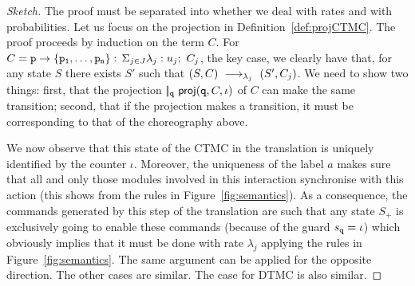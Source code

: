 \begin{proof}[Sketch] The proof must be separated into whether we deal
  with rates and with probabilities. Let us focus on the projection in
  Definition~\ref{def:projCTMC}. The proof proceeds by induction on
  the term $C$. For $C=\mathtt{p}\rightarrow \{\mathtt{\mathtt{p}_1,\ldots,\mathtt{p}_n}\}:\,\Sigma_{j\in J}\lambda_j: u_j;\ C_j$, the
  key case, we clearly have that, for any state $S$ there exists $S'$
  such that $(S,C)\ \longrightarrow_{\lambda_j}\ (S',C_j)$. We need to show two
  things: first, that the projection
  $|\!|_{\mathtt{q}}\ \mathsf{proj}{(\mathtt{q},C,\iota)}$ of $C$ can make the same
  transition; second, that if the projection makes a transition, it
  must be corresponding to that of the choreography above.

  We now observe that this state of the CTMC in the translation is
  uniquely identified by the counter $\iota$. 
  Moreover, the uniqueness of the label $a$ makes sure that all and
  only those modules involved in this interaction synchronise with
  this action (this shows from the rules in
  Figure~\ref{fig:semantics}).  As a consequence, the commands
  generated by this step of the translation are such that any state
  $S_+$ is exclusively going to enable these commands (because of the
  guard $s_{\mathtt{q}}=\iota$) which obviously implies that it must be
  done with rate $\lambda_j$ applying the rules in
  Figure~\ref{fig:semantics}. The same argument can be applied for the
  opposite direction. 
  The other cases are similar. The case for DTMC is also similar.






\end{proof}
